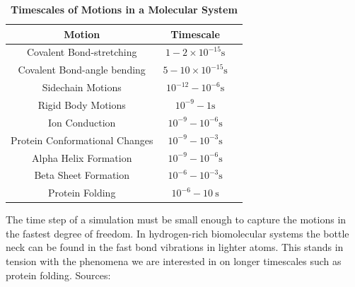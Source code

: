 \begin{table}
	\label{timescales}
	\begin{center}   
		\begin{tabular}{ |c|c|c|}
			\hline
			Motion & Timescale \\
			\hline
			Covalent Bond-stretching & $1-2\times10^{-15}\text{s}$ \\
			Covalent Bond-angle bending & $5-10\times10^{-15}\text{s}$ \\ 
			Sidechain  Motions & $10 ^{-12}-10^{-6}\text{s}$ \\
			Rigid Body Motions & $10 ^{-9}-1\text{s}$ \\
			Ion Conduction & $10^{-9}-10^{-6}\text{s}$ \\
			Protein Conformational Changes & $10^{-9}-10^{-3}\text{s}$ \\
			Alpha Helix Formation & $10^{-9}-10^{-6}\text{s}$ \\
			Beta Sheet Formation & $10^{-6}-10^{-3}\text{s}$ \\
			Protein Folding & $10^{-6}-10\ \text{s}$ \\
			\hline
		\end{tabular}
\end{center}
	\captionsetup{singlelinecheck = false, justification=raggedright}
	\caption[Timescales of Motions in a Molecular System]{\textbf{Timescales of Motions in a Molecular System}} {The time step of a simulation must be small enough to capture the motions in the fastest degree of freedom. In hydrogen-rich biomolecular systems the bottle neck can be found in the fast bond vibrations in lighter atoms. This stands in tension with the phenomena we are interested in on longer timescales such as protein folding. Sources: \cite{leach2009}\cite{schlick2010}\cite{brooks1988}\cite{flood2019}\cite{werner2012}} \cite{feenstra1999}
\end{table}

